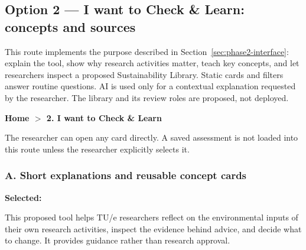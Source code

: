 \clearpage
\subsection{Option 2 --- I want to Check \& Learn: concepts and sources}
\label{sec:learn-dialogue}
This route implements the purpose described in Section~\ref{sec:phase2-interface}: explain the tool, show why research activities matter, teach key concepts, and let researchers inspect a proposed Sustainability Library. Static cards and filters answer routine questions. AI is used only for a contextual explanation requested by the researcher. The library and its review roles are proposed, not deployed.


\begin{learnscreen}
\textbf{Home $>$ 2. I want to Check \& Learn}\par\medskip
{}\quad
{}\quad
{}\quad
{}\quad
{}\par\medskip
The researcher can open any card directly. A saved assessment is not loaded into this route unless the researcher explicitly selects it.
\end{learnscreen}

\subsubsection*{A. Short explanations and reusable concept cards}
\begin{learnscreen}
\textbf{Selected:} \par
This proposed tool helps TU/e researchers reflect on the environmental inputs of their own research activities, inspect the evidence behind advice, and decide what to change. It provides guidance rather than research approval.\par\medskip
{}\quad
{}\quad
{}
\end{learnscreen}

